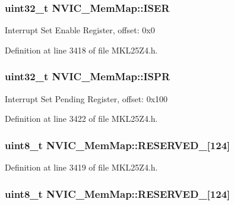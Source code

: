 \subsubsection[{\texorpdfstring{I\+S\+ER}{ISER}}]{\setlength{\rightskip}{0pt plus 5cm}uint32\+\_\+t N\+V\+I\+C\+\_\+\+Mem\+Map\+::\+I\+S\+ER}\hypertarget{struct_n_v_i_c___mem_map_aaa8fb79136e7f528c4644ca658d637e8}{}\label{struct_n_v_i_c___mem_map_aaa8fb79136e7f528c4644ca658d637e8}
Interrupt Set Enable Register, offset\+: 0x0 

Definition at line 3418 of file M\+K\+L25\+Z4.\+h.

\subsubsection[{\texorpdfstring{I\+S\+PR}{ISPR}}]{\setlength{\rightskip}{0pt plus 5cm}uint32\+\_\+t N\+V\+I\+C\+\_\+\+Mem\+Map\+::\+I\+S\+PR}\hypertarget{struct_n_v_i_c___mem_map_a91ab049ba145735fc8d9319f3b0f0cb4}{}\label{struct_n_v_i_c___mem_map_a91ab049ba145735fc8d9319f3b0f0cb4}
Interrupt Set Pending Register, offset\+: 0x100 

Definition at line 3422 of file M\+K\+L25\+Z4.\+h.

\subsubsection[{\texorpdfstring{R\+E\+S\+E\+R\+V\+E\+D\+\_\+0}{RESERVED_0}}]{\setlength{\rightskip}{0pt plus 5cm}uint8\+\_\+t N\+V\+I\+C\+\_\+\+Mem\+Map\+::\+R\+E\+S\+E\+R\+V\+E\+D\+\_\mbox{[}124\mbox{]}}\hypertarget{struct_n_v_i_c___mem_map_a69ae64c8f8f5a0fb7acb96ef4918cba2}{}\label{struct_n_v_i_c___mem_map_a69ae64c8f8f5a0fb7acb96ef4918cba2}


Definition at line 3419 of file M\+K\+L25\+Z4.\+h.

\subsubsection[{\texorpdfstring{R\+E\+S\+E\+R\+V\+E\+D\+\_\+1}{RESERVED_1}}]{\setlength{\rightskip}{0pt plus 5cm}uint8\+\_\+t N\+V\+I\+C\+\_\+\+Mem\+Map\+::\+R\+E\+S\+E\+R\+V\+E\+D\+\_\mbox{[}124\mbox{]}}\hypertarget{struct_n_v_i_c___mem_map_a334ef1820658212f8a0eac5e7a6f849c}{}\label{struct_n_v_i_c___mem_map_a334ef1820658212f8a0eac5e7a6f849c}


